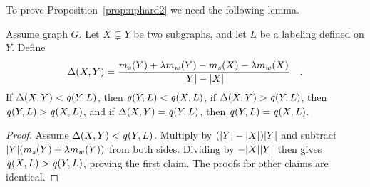 To prove Proposition~\ref{prop:nphard2} we need the following lemma.

\begin{lemma}
\label{lem:opt}
Assume graph $G$. Let $X \subsetneq Y$ be two subgraphs, and let $L$ be a labeling defined on $Y$. Define
\[
    \Delta(X, Y) = \frac{m_s(Y) + \lambda m_w(Y) - m_s(X) - \lambda m_w(X)}{{\left|Y\right|} - {\left|X\right|}}\quad.
\]
If $\Delta(X, Y) < \score{Y, L}$, then $\score{Y, L} < \score{X, L}$, if $\Delta(X, Y) > \score{Y, L}$, then $\score{Y, L} > \score{X, L}$,
and if $\Delta(X, Y) = \score{Y, L}$, then $\score{Y, L} = \score{X, L}$.
\end{lemma}

\begin{proof}
Assume $\Delta(X, Y) < \score{Y, L}$. Multiply by $({\left|Y\right|} - {\left|X\right|}){\left|Y\right|}$ and subtract ${\left|Y\right|} (m_s(Y)+\lambda m_w(Y))$ from both sides. Dividing by $-{\left|X\right|}{\left|Y\right|}$ then gives $\score{X,L} > \score{Y,L}$, proving the first claim. The proofs for other claims are identical.
\end{proof}


